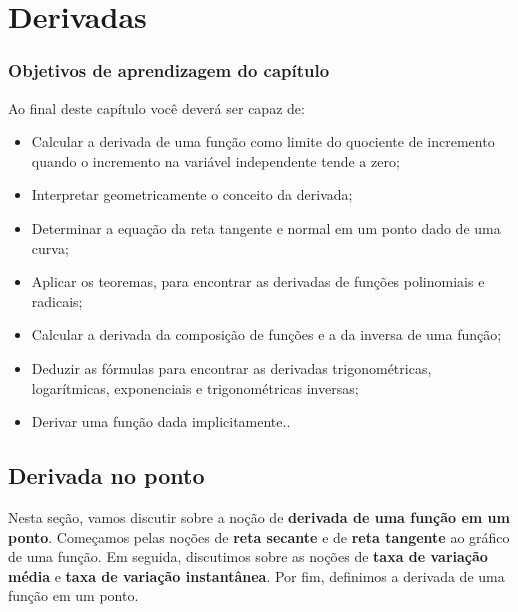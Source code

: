 \cleardoublepage\documentclass[../main.tex]{subfiles}
\begin{document}
\chapter{Derivadas}\label{chap:derivadas}
\minitoc
\subsection*{Objetivos de aprendizagem do capítulo}
Ao final deste capítulo você deverá ser capaz de:
\begin{itemize}
    \item Calcular a derivada de uma função como limite do quociente de incremento quando o incremento na variável independente tende a zero;
    \item   Interpretar geometricamente o conceito da derivada;
    \item Determinar a equação da reta tangente e normal em um ponto dado de uma curva;
    \item Aplicar os teoremas, para encontrar as derivadas de funções polinomiais e radicais;
    \item Calcular a derivada da composição de funções e a da inversa de uma função;
    \item Deduzir as fórmulas para encontrar as derivadas trigonométricas, logarítmicas, exponenciais e trigonométricas inversas;
    \item Derivar uma função dada implicitamente..
\end{itemize}
\section{Derivada no ponto}\label{sec:derivpt}

Nesta seção, vamos discutir sobre a noção de {\bf derivada de uma função em um ponto}. Começamos pelas noções de {\bf reta secante} e de {\bf reta tangente} ao gráfico de uma função. Em seguida, discutimos sobre as noções de {\bf taxa de variação média} e {\bf taxa de variação instantânea}. Por fim, definimos a derivada de uma função em um ponto.
\end{document}
